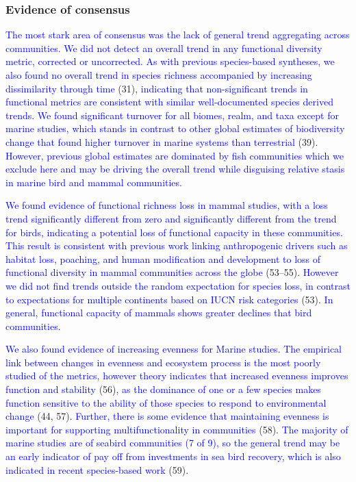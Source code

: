 \documentclass{article}
\begin{document}
\hypertarget{evidence-of-consensus}{%
\subsubsection{Evidence of consensus}\label{evidence-of-consensus}}

\textcolor{blue}{The most stark area of consensus was the lack of general trend aggregating across communities. We did not detect an overall trend in any functional diversity metric, corrected or uncorrected. As with previous species-based syntheses, we also found no overall trend in species richness accompanied by increasing dissimilarity through time}
(31)\textcolor{blue}{, indicating that non-significant trends in functional metrics are consistent with similar well-documented species derived trends. We found significant turnover for all biomes, realm, and taxa except for marine studies, which stands in contrast to other global estimates of biodiversity change that found higher turnover in marine systems than terrestrial}
(39).
\textcolor{blue}{However, previous global estimates are dominated by fish communities which we exclude here and may be driving the overall trend while disguising relative stasis in marine bird and mammal communities.}

\textcolor{blue}{We found evidence of functional richness loss in mammal studies, with a loss trend significantly different from zero and significantly different from the trend for birds, indicating a potential loss of functional capacity in these communities. This result is consistent with previous work linking anthropogenic drivers such as habitat loss, poaching, and human modification and development to loss of functional diversity in mammal communities across the globe}
(53--55).
\textcolor{blue}{However we did not find trends outside the random expectation for species loss, in contrast to expectations for multiple continents based on IUCN risk categories}
(53).
\textcolor{blue}{In general, functional capacity of mammals shows greater declines that bird communities.}

\textcolor{blue}{We also found evidence of increasing evenness for Marine studies. The empirical link between changes in evenness and ecosystem process is the most poorly studied of the metrics, however theory indicates that increased evenness improves function and stability }
(56),
\textcolor{blue}{as the dominance of one or a few species makes function sensitive to the ability of those species to respond to environmental change }(44,
57).
\textcolor{blue}{Further, there is some evidence that maintaining evenness is important for supporting multifunctionality in communities }(58).
\textcolor{blue}{The majority of marine studies are of seabird communities (7 of 9), so the general trend may be an early indicator of pay off from investments in sea bird recovery, which is also indicated in recent species-based work }(59).
\end{document}
